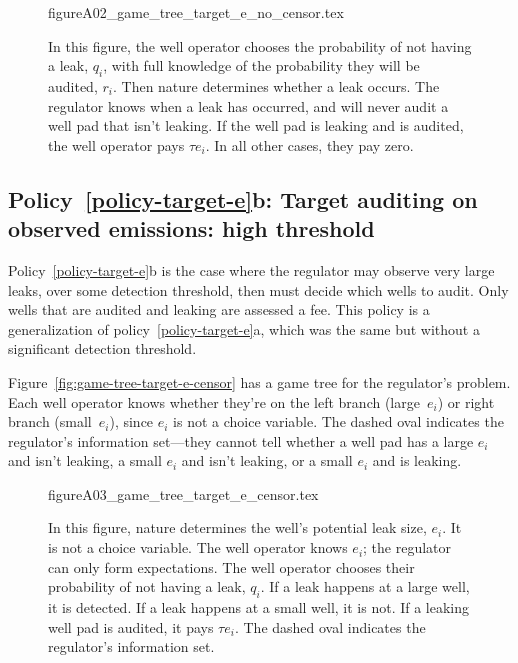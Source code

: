 \begin{figure}[!pbth] %
{figureA02_game_tree_target_e_no_censor.tex}

\begin{minipage}{1\textwidth}

\begin{justify}
{\small
In this figure, the well operator chooses the probability of not having a leak, \(q_i\), with full knowledge of the probability they will be audited, \(r_i\).
Then nature determines whether a leak occurs.
The regulator knows when a leak has occurred, and will never audit a well pad that isn't leaking.
If the well pad is leaking and is audited, the well operator pays \(\tau e_i\).
In all other cases, they pay zero.
}
\end{justify}
\end{minipage}
\end{figure}

\clearpage


\subsection{Policy~\ref{policy-target-e}b: Target auditing on observed emissions: high threshold}
\label{app:audit-target-e-high-threshold}

Policy~\ref{policy-target-e}b is the case where the regulator may observe very large leaks, over some detection threshold, then must decide which wells to audit.
Only wells that are audited and leaking are assessed a fee.
This policy is a generalization of policy~\ref{policy-target-e}a, which was the same but without a significant detection threshold.

Figure~\ref{fig:game-tree-target-e-censor} has a game tree for the regulator's problem.
Each well operator knows whether they're on the left branch (large~\(e_i\)) or right branch (small~\(e_i\)), since \(e_i\) is not a choice variable.
The dashed oval indicates the regulator's information set---they cannot tell whether a well pad has a large \(e_i\) and isn't leaking, a small \(e_i\) and isn't leaking, or a small \(e_i\) and is leaking.

\begin{figure}[!hbt]
{figureA03_game_tree_target_e_censor.tex}


\begin{minipage}{0.95\textwidth}

\begin{justify}
{\small
In this figure, nature determines the well's potential leak size, \(e_i\).
It is not a choice variable.
The well operator knows \(e_i\); the regulator can only form expectations.
The well operator chooses their probability of not having a leak, \(q_i\).
If a leak happens at a large well, it is detected.
If a leak happens at a small well, it is not.
If a leaking well pad is audited, it pays \(\tau e_i\).
The dashed oval indicates the regulator's information set.
}
\end{justify}
\end{minipage}
\end{figure}



